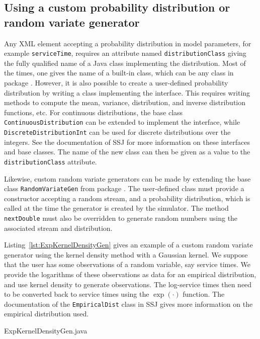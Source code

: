 \subsection{Using a custom probability distribution or random variate
  generator}

Any XML element accepting a probability distribution in model parameters, for
example \texttt{service\-Time}, requires an attribute named
\texttt{distribution\-Class} giving the fully qualified name of a Java
class implementing the distribution.
Most of the times, one gives the name of a built-in class, which can
be any class in package .
However, it is also possible to create a user-defined probability
distribution by writing a class implementing the
 interface.
This requires writing methods to compute the
mean, variance, distribution,
and inverse distribution functions, etc.
For continuous distributions, the base class
\texttt{Continuous\-Distribution} can be extended to implement the
interface,
while \texttt{Discrete\-Distribution\-Int} can be used for discrete
distributions over the integers.
See the documentation of SSJ for more information on these interfaces
and base classes.
The name of the new class can then be given as a value to the
\texttt{distribution\-Class} attribute.

Likewise, custom random variate generators can be made by extending
the base class \texttt{Random\-Variate\-Gen} from package
.
The user-defined class must provide a constructor accepting a random
stream, and a probability distribution, which is called at the time
the generator is created by the simulator.
The method
\texttt{next\-Double} must also be overridden
to generate random numbers using the
associated stream and distribution.

Listing~\ref{lst:ExpKernelDensityGen}
gives an example of a custom random variate generator using the kernel
density method with a Gaussian kernel.
We suppose that the user has some observations of a random variable,
say service times.
We provide the logarithms of these observations as data for an
empirical distribution, and use kernel density to generate
observations.
The log-service times then need to be converted back to service times
using the $\exp(\cdot)$ function.
The documentation of the \texttt{Empirical\-Dist} class in SSJ gives
more information on the empirical distribution used.


{ExpKernelDensityGen.java}

